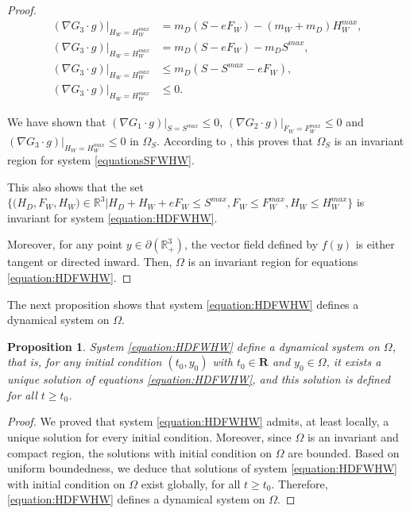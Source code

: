 \documentclass{article}
\newtheorem{prop}{Proposition}
\begin{document}
\begin{proof}
\begin{align*}
(\nabla G_3 \cdot g)|_{H_W = H_W^{max}} &= m_D (S - eF_W) - (m_W + m_D) H_W^{max}, \\
(\nabla G_3 \cdot g)|_{H_W = H_W^{max}} &= m_D (S - eF_W) - m_D S^{max}, \\
(\nabla G_3 \cdot g)|_{H_W = H_W^{max}} & \leq m_D (S - S^{max} -  eF_W), \\
(\nabla G_3 \cdot g)|_{H_W = H_W^{max}} & \leq 0.
\end{align*}

We have shown that $(\nabla G_1 \cdot g)|_{S = S^{max}} \leq 0$, $(\nabla G_2 \cdot g)|_{F_W = F_W^{max}} \leq 0$ and $(\nabla G_3 \cdot g)|_{H_W = H_W^{max}} \leq 0$ in  $\Omega_S$.  According to \cite{smoller_shock_1994}, this proves that $\Omega_S$ is an invariant region for system \eqref{equationsSFWHW}.

This also shows that the set  $\Big\{\Big(H_D, F_W, H_W \Big) \in \mathbb{R}^3  \Big|H_D + H_W + eF_W \leq S^{max}, F_W \leq F_W^{max}, H_W \leq H_W^{max} \Big\}$ is invariant for system \eqref{equation:HDFWHW}. 


Moreover, for any point $y \in \partial (\mathbb{R}_+^3)$, the vector field defined by $f(y)$ is either tangent or directed inward. Then, $\Omega$ is an invariant region for equations \eqref{equation:HDFWHW}. 

\end{proof}

The next proposition shows that system \eqref{equation:HDFWHW} defines a dynamical system on $\Omega$.

\begin{prop}
System \eqref{equation:HDFWHW} define a dynamical system on $\Omega$, that is, for any initial condition $(t_0, y_0)$ with $t_0 \in \mathbf{R}$ and $y_0 \in \Omega$, it exists a unique solution of equations \eqref{equation:HDFWHW}, and this solution is defined for all $t \geq t_0$.
\end{prop}

\begin{proof}
We proved that system \eqref{equation:HDFWHW} admits, at least locally, a unique solution for every initial condition. Moreover, since $\Omega$ is an invariant and compact region, the solutions with initial condition on $\Omega$ are bounded. Based on uniform boundedness, we deduce that solutions of system \eqref{equation:HDFWHW} with initial condition on $\Omega$ exist globally, for all $t\geq t_0$. Therefore, \eqref{equation:HDFWHW} defines a dynamical system on $\Omega$.
\end{proof}
\end{document}
